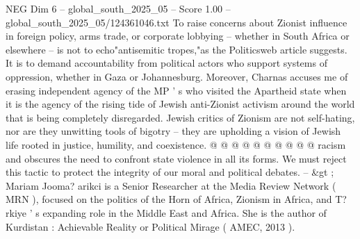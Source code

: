 \begin{textsample}{NEG Dim 6 – global\_south\_2025\_05 – Score 1.00 – global\_south\_2025\_05/124361046.txt}
To raise concerns about Zionist influence in foreign policy, arms trade, or corporate lobbying -- whether in South Africa or elsewhere -- is not to echo"antisemitic tropes,"as the Politicsweb article suggests.
It is to demand accountability from political actors who support systems of oppression, whether in Gaza or Johannesburg.
Moreover, Charnas accuses me of erasing independent agency of the MP ' s who visited the Apartheid state when it is the agency of the rising tide of Jewish anti-Zionist activism around the world that is being completely disregarded.
Jewish critics of Zionism are not self-hating, nor are they unwitting tools of bigotry -- they are upholding a vision of Jewish life rooted in justice, humility, and coexistence. @ @ @ @ @ @ @ @ @ @ racism and obscures the need to confront state violence in all its forms.
We must reject this tactic to protect the integrity of our moral and political debates. -- \&gt ; Mariam Jooma? arikci is a Senior Researcher at the Media Review Network ( MRN ), focused on the politics of the Horn of Africa, Zionism in Africa, and T? rkiye ' s expanding role in the Middle East and Africa.
She is the author of Kurdistan : Achievable Reality or Political Mirage ( AMEC, 2013 ).

\end{textsample}
